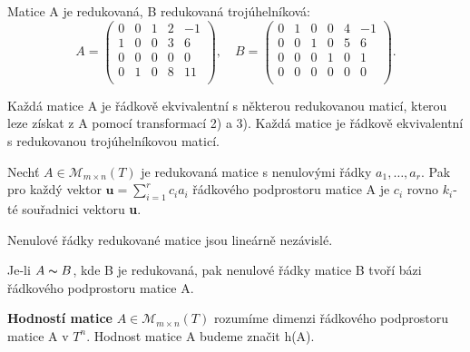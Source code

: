 \begin{example}
 Matice A je redukovaná, B redukovaná trojúhelníková:
\begin{displaymath}
	A = \left( \begin{array}{ccccc}
	0 & 0 & 1 & 2 & -1 \\
	1 & 0 & 0 & 3 & 6 \\
	0 & 0 & 0 & 0 & 0 \\
	0 & 1 & 0 & 8 & 11 \\
	\end{array}\right), \quad 
	B = \left( \begin{array}{cccccc}
	0 & 1 & 0 & 0 & 4 & -1 \\
	0 & 0 & 1 & 0 & 5 & 6 \\
	0 & 0 & 0 & 1 & 0 & 1 \\
	0 & 0 & 0 & 0 & 0 & 0 \\
	\end{array}\right).
\end{displaymath}
\end{example}

\begin{sentence}
	Každá matice A je řádkově ekvivalentní s některou redukovanou maticí, kterou leze získat z A pomocí transformací 2) a 3). Každá matice je řádkově ekvivalentní s redukovanou trojúhelníkovou maticí.
\end{sentence}

\begin{definition}
	Nechť $A \in \mathscr{M}_{m \times n}(T)$ je redukovaná matice s nenulovými řádky $a_1,\dots, a_r$. Pak pro každý vektor $\textbf{u} = \sum_{i=1}^r c_i a_i$ řádkového podprostoru matice A je $c_i$ rovno $k_i$-té souřadnici vektoru \textbf{u}. 
\end{definition}

\begin{result}
	Nenulové řádky redukované matice jsou lineárně nezávislé.
\end{result}

\begin{result}
	Je-li $A \thicksim B$, kde B je redukovaná, pak nenulové řádky matice B tvoří bázi řádkového podprostoru matice A.
\end{result}

\begin{definition}
	\textbf{Hodností matice} $A \in \mathscr{M}_{m \times n}(T)$ rozumíme dimenzi řádkového podprostoru matice A v $T^n$. Hodnost matice A budeme značit h(A).
\end{definition}

